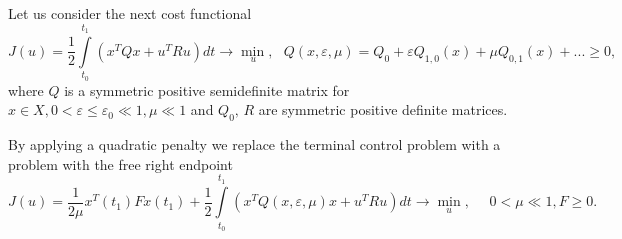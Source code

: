 \documentclass[12pt]{llncs}
\begin{document}
Let us consider the next cost functional
\begin{equation}
	J(u) = \frac{1}{2}\int\limits_{{t_0}}^{{t_1}} {\left( {{x^T}Qx + {u^T}Ru} \right)dt}  \to \mathop {\min }\limits_{\,u} ,\,\,\,\,Q(x,\varepsilon, \mu ) = {Q_0} + \varepsilon Q_{1,0}(x) + \mu Q_{0,1}(x)+... \geq 0,
\end{equation}
where $Q$  is a symmetric positive semidefinite matrix for $x \in X, 0 < \varepsilon \leq{\varepsilon _0} \ll 1 , \mu  \ll  1 $  and  ${Q_0},\,R$  are  symmetric positive definite matrices.

By applying a quadratic penalty we replace the terminal control problem with a problem with the free right endpoint
\begin{equation}
	J(u) = \frac{1}{{2\mu }}{x^T}({t_1})Fx({t_1}) + \frac{1}{2}\int\limits_{{t_0}}^{{t_1}} {\left( {{x^T}Q(x,\varepsilon, \mu )x + {u^T}Ru} \right)dt}  \to \mathop {\min }\limits_u ,\,\,\quad 0 < \mu  \ll 1,F \geq 0.
\end{equation}
\end{document}
